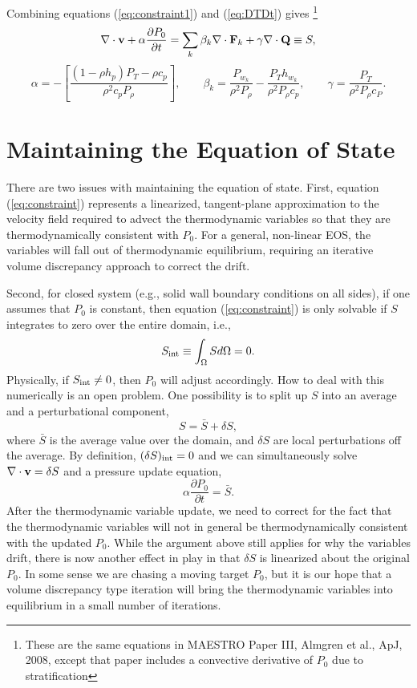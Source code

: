\documentclass[final]{siamltex}
\def\Fb {{\bf F}}
\def\Qb {{\bf Q}}
\def\vb {{\bf v}}
\begin{document}
Combining equations (\ref{eq:constraint1}) and (\ref{eq:DTDt}) gives
\footnote{These are the same equations in MAESTRO Paper III, Almgren et al., ApJ, 2008, except that paper includes a convective derivative of $P_0$ due to stratification}
\begin{equation}
\nabla\cdot\vb + \alpha\frac{\partial P_0}{\partial t} = \sum_k \beta_k \nabla\cdot\Fb_k + \gamma \nabla\cdot\Qb \equiv S,\label{eq:constraint}
\end{equation}
\begin{equation}
\alpha = -\left[\frac{(1-\rho h_p)P_T - \rho c_p}{\rho^2 c_p P_\rho}\right], \qquad
\beta_k = \frac{P_{w_k}}{\rho^2 P_\rho} - \frac{P_T h_{w_k}}{\rho^2 P_\rho c_p}, \qquad
\gamma = \frac{P_T}{\rho^2 P_\rho c_P}.
\end{equation}

\section{Maintaining the Equation of State}
There are two issues with maintaining the equation of state.  First, equation 
(\ref{eq:constraint}) represents a linearized, tangent-plane approximation to the 
velocity field required to advect the thermodynamic variables so that they are 
thermodynamically consistent with $P_0$.  For a general, non-linear EOS, the 
variables will fall out of thermodynamic equilibrium, requiring an iterative volume 
discrepancy approach to correct the drift.

Second, for closed system (e.g., solid wall boundary conditions on all sides), if one 
assumes that $P_0$ is constant, then equation (\ref{eq:constraint}) is only solvable 
if $S$ integrates to zero over the entire domain, i.e.,
\begin{equation}
S_{\rm int} \equiv \int_\Omega S d\Omega = 0.
\end{equation}
Physically, if $S_{\rm int} \ne 0$, then $P_0$ will adjust accordingly.  How to deal with
this numerically is an open problem.  One possibility is to split up $S$ into an average
and a perturbational component,
\begin{equation}
S = \bar{S} + \delta S,
\end{equation}
where $\bar{S}$ is the average value over the domain, and $\delta S$ are local 
perturbations off the average.  By definition, $(\delta S)_{\rm int}=0$ and we can
simultaneously solve $\nabla\cdot\vb = \delta S$ and a pressure update equation,
\begin{equation}
\alpha\frac{\partial P_0}{\partial t} = \bar{S}.
\end{equation}
After the thermodynamic variable update, we need to correct for the fact that the 
thermodynamic variables will not in general be thermodynamically consistent with the 
updated $P_0$.  While the argument above still applies for why the variables drift, there 
is now another effect in play in that $\delta S$ is linearized about the original $P_0$.  
In some sense we are chasing a moving target $P_0$, but it is our hope that a volume 
discrepancy type iteration will bring the thermodynamic variables into equilibrium in 
a small number of iterations.
\end{document}
